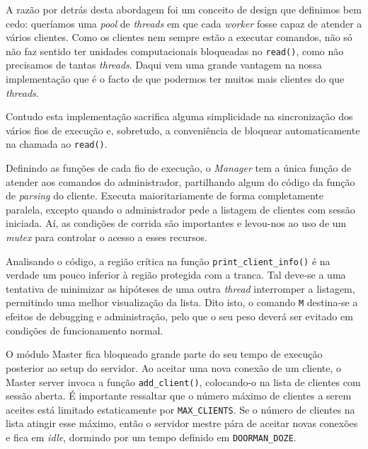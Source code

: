 	A razão por detrás desta abordagem foi um conceito de design que definimos bem cedo: queríamos uma \emph{pool} de \emph{threads} em que cada \emph{worker} fosse capaz de atender a vários clientes.
	Como os clientes nem sempre estão a executar comandos, não só não faz sentido ter unidades computacionais bloqueadas no \verb|read()|, como não precisamos de tantas \emph{threads}.
	Daqui vem uma grande vantagem na nossa implementação que é o facto de que podermos ter muitos mais clientes do que \emph{threads}.

	Contudo esta implementação sacrifica alguma simplicidade na sincronização dos vários fios de execução e, sobretudo, a conveniência de bloquear automaticamente na chamada ao \verb|read()|.

	\setlength{\parskip}{20pt}		%

	Definindo as funções de cada fio de execução, o \emph{Manager} tem a única função de atender aos comandos do administrador, partilhando algum do código da função de \emph{parsing} do cliente.
	Executa maioritariamente de forma completamente paralela, excepto quando o administrador pede a listagem de clientes com sessão iniciada.
	Aí, as condições de corrida são importantes e levou-nos ao uso de um \emph{mutex} para controlar o acesso a esses recursos.

	\setlength{\parskip}{5pt}		%

	Analisando o código, a região crítica na função \verb|print_client_info()| é na verdade um pouco inferior à região protegida com a tranca.
	Tal deve-se a uma tentativa de minimizar as hipóteses de uma outra \emph{thread} interromper a listagem, permitindo uma melhor visualização da lista.
	Dito isto, o comando \verb|M| destina-se a efeitos de debugging e administração, pelo que o seu peso deverá ser evitado em condições de funcionamento normal.

	\setlength{\parskip}{20pt}		%

	O módulo Master fica bloqueado grande parte do seu tempo de execução posterior ao setup do servidor.
	Ao aceitar uma nova conexão de um cliente, o Master server invoca a função \verb|add_client()|, colocando-o na lista de clientes com sessão aberta.
	É importante ressaltar que o número máximo de clientes a serem aceites está limitado estaticamente por \verb|MAX_CLIENTS|.
	Se o número de clientes na lista atingir esse máximo, então o servidor mestre pára de aceitar novas conexões e fica em \emph{idle}, dormindo por um tempo definido em \verb|DOORMAN_DOZE|.


